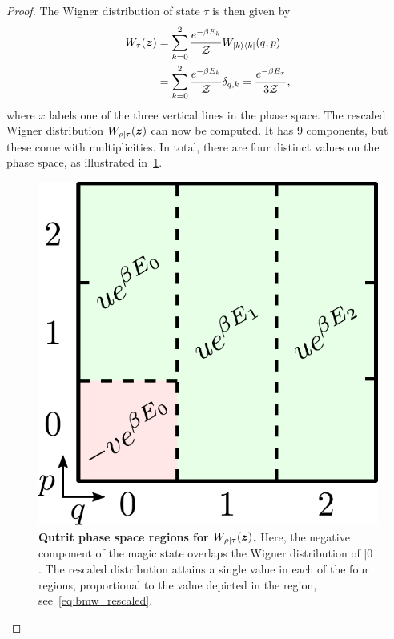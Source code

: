 \documentclass[pra,
aps,
twocolumn,
superscriptaddress,
groupedaddress,
nofootinbib,
reprint
]{revtex4-1}
\begin{document}
\begin{proof}
The Wigner distribution of state $\tau$ is then given by
\begin{align}
	\W[\bmz]{\tau} &= \sum\limits_{k=0}^2 \frac{e^{-\beta E_k}}{\Z}W_{|k\>\<k|}(q, p) \nonumber\\
	&= \sum\limits_{k=0}^2 \frac{e^{-\beta E_k}}{\Z} \delta_{q, k} = \frac{e^{-\beta E_x}}{3\Z},
\end{align}
where $x$ labels one of the three vertical lines in the phase space.
The rescaled Wigner distribution $W_{\rho|\tau}(\bm{z})$ can now be computed. It has $9$ components, but these come with multiplicities. In total, there are four distinct values on the phase space, as illustrated in~\cref{fig:pd_split}.
\begin{figure}[h]
    \centering
    \includegraphics[scale=0.35]{figs/pd_split_thermal.pdf}
    \caption{\textbf{Qutrit phase space regions for $W_{\rho | \tau}(\bm{z})$.}
    Here, the negative component of the magic state overlaps the Wigner distribution of $|0\>$. The rescaled distribution attains a single value in each of the four regions, proportional to the value depicted in the region, see~\cref{eq:bmw_rescaled}.
    }
    \label{fig:pd_split}
\end{figure}


\end{proof}
\end{document}

